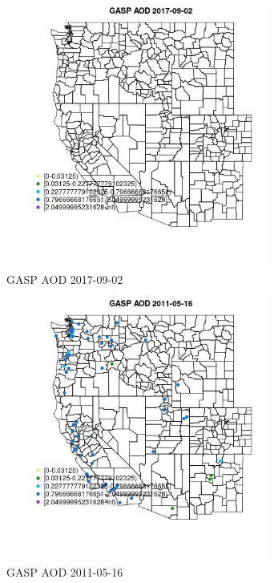 \begin{figure} 
\centering  
\includegraphics[width=0.77\textwidth]{Code_Outputs/Report_ML_input_PM25_Step4_part_e_de_duplicated_aveswNAs_MapObsGASP_AOD2017-09-02.jpg} 
\caption{\label{fig:Report_ML_input_PM25_Step4_part_e_de_duplicated_aveswNAsMapObsGASP_AOD2017-09-02}GASP AOD 2017-09-02} 
\end{figure} 
 

\clearpage 

\begin{figure} 
\centering  
\includegraphics[width=0.77\textwidth]{Code_Outputs/Report_ML_input_PM25_Step4_part_e_de_duplicated_aveswNAs_MapObsGASP_AOD2011-05-16.jpg} 
\caption{\label{fig:Report_ML_input_PM25_Step4_part_e_de_duplicated_aveswNAsMapObsGASP_AOD2011-05-16}GASP AOD 2011-05-16} 
\end{figure} 
 


